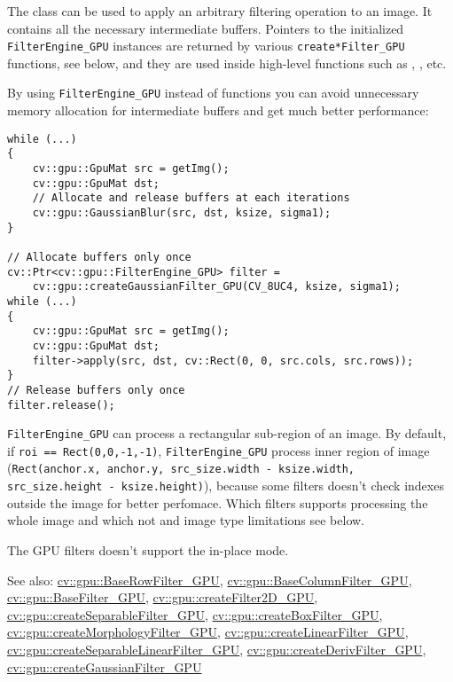 The class can be used to apply an arbitrary filtering operation to an image. It contains all the necessary intermediate buffers. Pointers to the initialized \texttt{FilterEngine\_GPU} instances are returned by various \texttt{create*Filter\_GPU} functions, see below, and they are used inside high-level functions such as , ,  etc.

By using \texttt{FilterEngine\_GPU} instead of functions you can avoid unnecessary memory allocation for intermediate buffers and get much better performance:

\begin{lstlisting}
while (...)
{
    cv::gpu::GpuMat src = getImg();
    cv::gpu::GpuMat dst;
    // Allocate and release buffers at each iterations
    cv::gpu::GaussianBlur(src, dst, ksize, sigma1);
}

// Allocate buffers only once
cv::Ptr<cv::gpu::FilterEngine_GPU> filter = 
    cv::gpu::createGaussianFilter_GPU(CV_8UC4, ksize, sigma1);
while (...)
{
    cv::gpu::GpuMat src = getImg();
    cv::gpu::GpuMat dst;
    filter->apply(src, dst, cv::Rect(0, 0, src.cols, src.rows));
}
// Release buffers only once
filter.release();
\end{lstlisting}

\texttt{FilterEngine\_GPU} can process a rectangular sub-region of an image. By default, if \texttt{roi == Rect(0,0,-1,-1)}, \texttt{FilterEngine\_GPU} process inner region of image (\texttt{Rect(anchor.x, anchor.y, src\_size.width - ksize.width, src\_size.height - ksize.height)}), because some filters doesn't check indexes outside the image for better perfomace. Which filters supports processing the whole image and which not and image type limitations see below.

The GPU filters doesn't support the in-place mode.

See also: \hyperref[class.gpu.BaseRowFilter]{cv::gpu::BaseRowFilter\_GPU}, \hyperref[class.gpu.BaseColumnFilter]{cv::gpu::BaseColumnFilter\_GPU}, \hyperref[class.gpu.BaseFilter]{cv::gpu::BaseFilter\_GPU}, \hyperref[cppfunc.gpu.createFilter2D]{cv::gpu::createFilter2D\_GPU}, \hyperref[cppfunc.gpu.createSeparableFilter]{cv::gpu::createSeparableFilter\_GPU}, \hyperref[cppfunc.gpu.createBoxFilter]{cv::gpu::createBoxFilter\_GPU}, \hyperref[cppfunc.gpu.createMorphologyFilter]{cv::gpu::createMorphologyFilter\_GPU}, \hyperref[cppfunc.gpu.createLinearFilter]{cv::gpu::createLinearFilter\_GPU}, \hyperref[cppfunc.gpu.createSeparableLinearFilter]{cv::gpu::createSeparableLinearFilter\_GPU}, \hyperref[cppfunc.gpu.createDerivFilter]{cv::gpu::createDerivFilter\_GPU}, \hyperref[cppfunc.gpu.createGaussianFilter]{cv::gpu::createGaussianFilter\_GPU}


